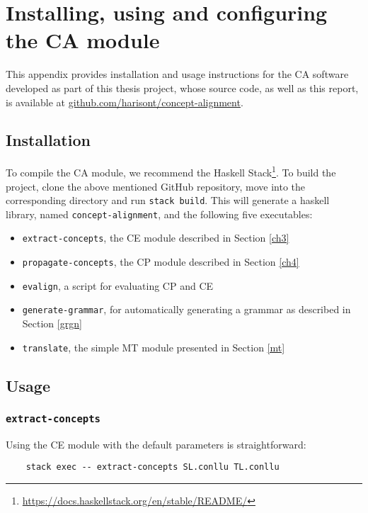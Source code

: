 \chapter{Installing, using and configuring the CA module} \label{b}
This appendix provides installation and usage instructions for the CA software developed as part of this thesis project, whose source code, as well as this report, is available at \url{github.com/harisont/concept-alignment}.

\section{Installation}
To compile the CA module, we recommend the Haskell Stack\footnote{\url{https://docs.haskellstack.org/en/stable/README/}}. 
To build the project, clone the above mentioned GitHub repository, move into the corresponding directory and run \texttt{stack build}. 
This will generate a haskell library, named \texttt{concept-alignment}, and the following five executables: \smallskip

\begin{itemize}
    \item \texttt{extract-concepts}, the CE module described in Section \ref{ch3}
    \item \texttt{propagate-concepts}, the CP module described in Section \ref{ch4}
    \item \texttt{evalign}, a script for evaluating CP and CE
    \item \texttt{generate-grammar}, for automatically generating a grammar as described in Section \ref{grgn}
    \item \texttt{translate}, the simple MT module presented in Section \ref{mt}
\end{itemize}

\section{Usage}
\subsection{\texttt{extract-concepts}}
Using the CE module with the default parameters is straightforward: \smallskip

\begin{verbatim}
    stack exec -- extract-concepts SL.conllu TL.conllu
\end{verbatim} \smallskip

